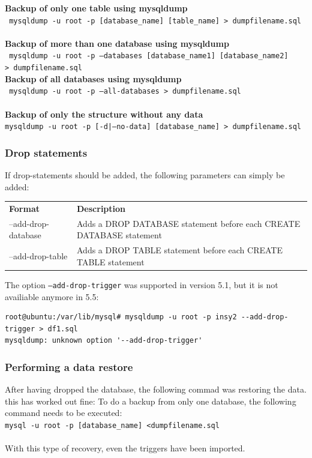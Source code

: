\documentclass[10pt]{article}
\begin{document}
\textbf{Backup of only one table using mysqldump}\\
\texttt{ mysqldump -u root -p [database\_name] [table\_name] \textgreater ~dumpfilename.sql } \\ \\
\textbf{Backup of more than one database using mysqldump}\\
\texttt{ mysqldump -u root -p --databases [database\_name1] [database\_name2] \textgreater ~dumpfilename.sql } \\ 
\textbf{Backup of all databases using mysqldump}\\
\texttt{ mysqldump -u root -p --all-databases \textgreater ~dumpfilename.sql } \\ \\
\textbf{Backup of only the structure without any data}\\
\texttt{mysqldump -u root -p [-d|--no-data] [database\_name] \textgreater ~dumpfilename.sql }
\subsubsection{Drop statements}
If drop-statements should be added, the following parameters can simply be added:
\begin{table}[h]
\begin{tabular}{ll}
\textbf{Format}     & \textbf{Description}                                                \\
--add-drop-database & Adds a DROP DATABASE statement before each CREATE DATABASE statement \\
--add-drop-table    & Adds a DROP TABLE statement before each CREATE TABLE statement       \\
\end{tabular}
\end{table} \cite{mysqldumpman}
The option \texttt{--add-drop-trigger} was supported in version 5.1, but it is not availiable anymore in 5.5:  
\begin{lstlisting}    
root@ubuntu:/var/lib/mysql# mysqldump -u root -p insy2 --add-drop-trigger > df1.sql
mysqldump: unknown option '--add-drop-trigger' 
\end{lstlisting}    
\subsubsection{Performing a data restore}
After having dropped the database, the following commad was restoring the data. this has worked out fine:
To do a backup from only one database, the following command needs to be executed: \\
\texttt{mysql -u root -p [database\_name] \textless dumpfilename.sql} \\ \\
With this type of recovery, even the triggers have been imported.
\newpage
\end{document}
